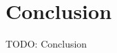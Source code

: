 \documentclass[\main/thesis.tex]{subfiles}
\begin{document}
\chapter{Conclusion}
\label{chp:conclusion}

TODO: Conclusion

\end{document}
